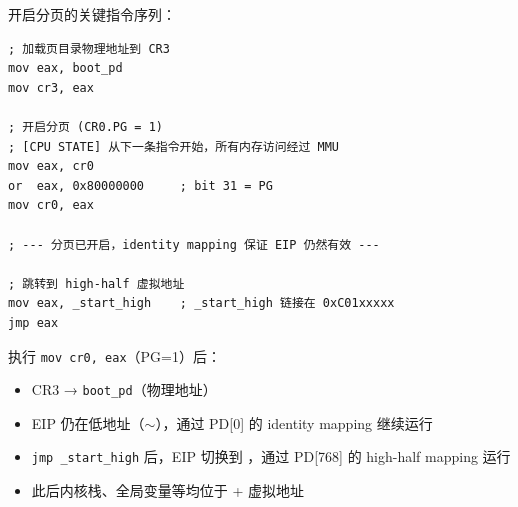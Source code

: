 开启分页的关键指令序列：

\begin{lstlisting}[style=nasmstyle, caption={boot.asm：开启分页并跳转到 high-half}]
; 加载页目录物理地址到 CR3
mov eax, boot_pd
mov cr3, eax

; 开启分页 (CR0.PG = 1)
; [CPU STATE] 从下一条指令开始，所有内存访问经过 MMU
mov eax, cr0
or  eax, 0x80000000     ; bit 31 = PG
mov cr0, eax

; --- 分页已开启，identity mapping 保证 EIP 仍然有效 ---

; 跳转到 high-half 虚拟地址
mov eax, _start_high    ; _start_high 链接在 0xC01xxxxx
jmp eax
\end{lstlisting}

\begin{cpustate}
执行 \texttt{mov cr0, eax}（PG=1）后：
\begin{itemize}
  \item CR3 → \texttt{boot\_pd}（物理地址）
  \item EIP 仍在低地址（$\sim$），通过 PD[0] 的 identity mapping 继续运行
  \item \texttt{jmp \_start\_high} 后，EIP 切换到 ，通过 PD[768] 的 high-half mapping 运行
  \item 此后内核栈、全局变量等均位于 + 虚拟地址
\end{itemize}
\end{cpustate}


